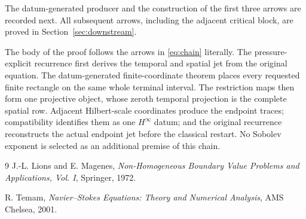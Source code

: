 \documentclass[11pt]{article}
\theoremstyle{definition}
\theoremstyle{remark}
\begin{document}
The datum-generated producer and the construction of the first three arrows
are recorded next. All subsequent arrows, including the adjacent critical
block, are proved in Section~\ref{sec:downstream}.

The body of the proof follows the arrows in \eqref{eq:chain} literally.  The
pressure-explicit recurrence first derives the temporal and spatial jet from
the original equation.  The datum-generated finite-coordinate theorem places
every requested finite rectangle on the same whole terminal interval.  The
restriction maps then form one projective object, whose zeroth temporal
projection is the complete spatial row.  Adjacent Hilbert-scale coordinates
produce the endpoint traces; compatibility identifies them as one
\(H^\infty\) datum; and the original recurrence reconstructs the actual
endpoint jet before the classical restart.  No Sobolev exponent is selected
as an additional premise of this chain.




\begin{thebibliography}{9}
J.-L. Lions and E. Magenes,
\emph{Non-Homogeneous Boundary Value Problems and Applications, Vol. I},
Springer, 1972.

R. Temam,
\emph{Navier--Stokes Equations: Theory and Numerical Analysis},
AMS Chelsea, 2001.
\end{thebibliography}
\end{document}
